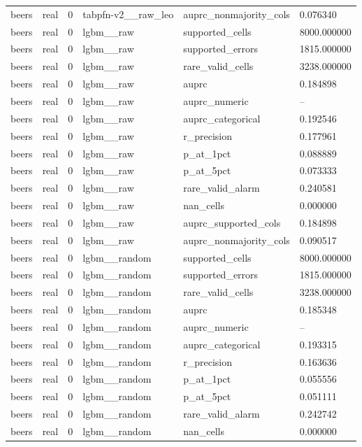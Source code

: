 \begin{tabular}{llllll}
beers & real & 0 & tabpfn-v2\_\_raw\_leo & auprc\_nonmajority\_cols & 0.076340 \\
beers & real & 0 & lgbm\_\_raw & supported\_cells & 8000.000000 \\
beers & real & 0 & lgbm\_\_raw & supported\_errors & 1815.000000 \\
beers & real & 0 & lgbm\_\_raw & rare\_valid\_cells & 3238.000000 \\
beers & real & 0 & lgbm\_\_raw & auprc & 0.184898 \\
beers & real & 0 & lgbm\_\_raw & auprc\_numeric & -- \\
beers & real & 0 & lgbm\_\_raw & auprc\_categorical & 0.192546 \\
beers & real & 0 & lgbm\_\_raw & r\_precision & 0.177961 \\
beers & real & 0 & lgbm\_\_raw & p\_at\_1pct & 0.088889 \\
beers & real & 0 & lgbm\_\_raw & p\_at\_5pct & 0.073333 \\
beers & real & 0 & lgbm\_\_raw & rare\_valid\_alarm & 0.240581 \\
beers & real & 0 & lgbm\_\_raw & nan\_cells & 0.000000 \\
beers & real & 0 & lgbm\_\_raw & auprc\_supported\_cols & 0.184898 \\
beers & real & 0 & lgbm\_\_raw & auprc\_nonmajority\_cols & 0.090517 \\
beers & real & 0 & lgbm\_\_random & supported\_cells & 8000.000000 \\
beers & real & 0 & lgbm\_\_random & supported\_errors & 1815.000000 \\
beers & real & 0 & lgbm\_\_random & rare\_valid\_cells & 3238.000000 \\
beers & real & 0 & lgbm\_\_random & auprc & 0.185348 \\
beers & real & 0 & lgbm\_\_random & auprc\_numeric & -- \\
beers & real & 0 & lgbm\_\_random & auprc\_categorical & 0.193315 \\
beers & real & 0 & lgbm\_\_random & r\_precision & 0.163636 \\
beers & real & 0 & lgbm\_\_random & p\_at\_1pct & 0.055556 \\
beers & real & 0 & lgbm\_\_random & p\_at\_5pct & 0.051111 \\
beers & real & 0 & lgbm\_\_random & rare\_valid\_alarm & 0.242742 \\
beers & real & 0 & lgbm\_\_random & nan\_cells & 0.000000 \\

\end{tabular}

